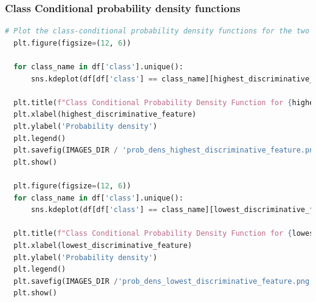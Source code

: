 \documentclass{article}
\begin{document}
\subsubsection*{Class Conditional probability density functions}
\begin{lstlisting}[language=Python]
  # Plot the class-conditional probability density functions for the two selected features
  plt.figure(figsize=(12, 6))
  
  for class_name in df['class'].unique():
      sns.kdeplot(df[df['class'] == class_name][highest_discriminative_feature], label=class_name)
  
  plt.title(f"Class Conditional Probability Density Function for {highest_discriminative_feature}")
  plt.xlabel(highest_discriminative_feature)
  plt.ylabel('Probability density')
  plt.legend()
  plt.savefig(IMAGES_DIR / 'prob_dens_highest_discriminative_feature.png')
  plt.show()
  
  plt.figure(figsize=(12, 6))
  for class_name in df['class'].unique():
      sns.kdeplot(df[df['class'] == class_name][lowest_discriminative_feature], label=class_name)
  
  plt.title(f"Class Conditional Probability Density Function for {lowest_discriminative_feature}")
  plt.xlabel(lowest_discriminative_feature)
  plt.ylabel('Probability density')
  plt.legend()
  plt.savefig(IMAGES_DIR /'prob_dens_lowest_discriminative_feature.png')
  plt.show()
\end{lstlisting}
\end{document}
